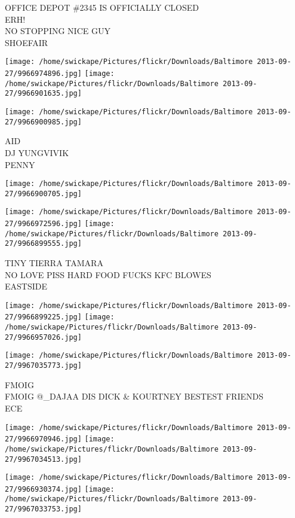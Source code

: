 \documentclass[10pt,letterpaper]{article}
\begin{document}
OFFICE DEPOT \#2345 IS OFFICIALLY CLOSED\\
ERH!\\
NO STOPPING NICE GUY\\
SHOEFAIR
\pagebreak

\texttt{[image: /home/swickape/Pictures/flickr/Downloads/Baltimore 2013-09-27/9966974896.jpg]}
\texttt{[image: /home/swickape/Pictures/flickr/Downloads/Baltimore 2013-09-27/9966901635.jpg]}

\texttt{[image: /home/swickape/Pictures/flickr/Downloads/Baltimore 2013-09-27/9966900985.jpg]}

AID\\
DJ YUNGVIVIK\\
PENNY
\pagebreak

\texttt{[image: /home/swickape/Pictures/flickr/Downloads/Baltimore 2013-09-27/9966900705.jpg]}

\vspace{0.25in}
\texttt{[image: /home/swickape/Pictures/flickr/Downloads/Baltimore 2013-09-27/9966972596.jpg]}
\texttt{[image: /home/swickape/Pictures/flickr/Downloads/Baltimore 2013-09-27/9966899555.jpg]}

TINY TIERRA TAMARA\\
NO LOVE PISS HARD FOOD FUCKS KFC BLOWES\\
EASTSIDE
\pagebreak

\texttt{[image: /home/swickape/Pictures/flickr/Downloads/Baltimore 2013-09-27/9966899225.jpg]}
\texttt{[image: /home/swickape/Pictures/flickr/Downloads/Baltimore 2013-09-27/9966957026.jpg]}

\vspace{0.25in}
\texttt{[image: /home/swickape/Pictures/flickr/Downloads/Baltimore 2013-09-27/9967035773.jpg]}

FMOIG\\
FMOIG @\_DAJAA DIS DICK \& KOURTNEY BESTEST FRIENDS\\
ECE
\pagebreak

\texttt{[image: /home/swickape/Pictures/flickr/Downloads/Baltimore 2013-09-27/9966970946.jpg]}
\texttt{[image: /home/swickape/Pictures/flickr/Downloads/Baltimore 2013-09-27/9967034513.jpg]}

\texttt{[image: /home/swickape/Pictures/flickr/Downloads/Baltimore 2013-09-27/9966930374.jpg]}
\texttt{[image: /home/swickape/Pictures/flickr/Downloads/Baltimore 2013-09-27/9967033753.jpg]}
\end{document}
